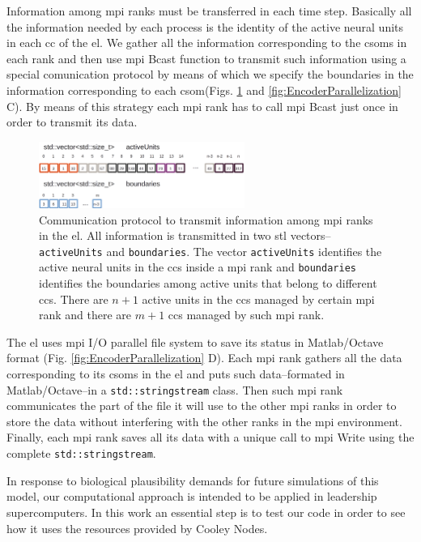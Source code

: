 \documentclass[11pt,a4paper]{article}
\begin{document}
Information among \gls{mpi} ranks must be transferred in each time step. Basically all the information needed by each process is the identity of the active neural units in each \gls{cc} of the \gls{el}. We gather all the information corresponding to the \glspl{csom} in each rank and then use \gls{mpi} Bcast function to transmit such information using a special comunication protocol by means of which we specify the boundaries in the information corresponding to each \gls{csom}(Figs. \ref{fig:BCast} and \ref{fig:EncoderParallelization} C). By means of this strategy each \gls{mpi} rank has to call \gls{mpi} Bcast just once in order to transmit its data.

\begin{figure}[h!]
    \centering
    \includegraphics[width=0.6\textwidth]{BCast.png}
    \caption{Communication protocol to transmit information among \gls{mpi} ranks in the \gls{el}. All information is transmitted in two \gls{stl} vectors--\texttt{activeUnits} and \texttt{boundaries}. The vector \texttt{activeUnits} identifies the active neural units in the \glspl{cc} inside a \gls{mpi} rank and \texttt{boundaries} identifies the boundaries among active units that belong to different \glspl{cc}. There are $n+1$ active units in the \glspl{cc} managed by certain \gls{mpi} rank and there are $m+1$ \glspl{cc} managed by such \gls{mpi} rank.}
    \label{fig:BCast}
\end{figure}

The \gls{el} uses \gls{mpi} I/O parallel file system to save its status in Matlab/Octave format (Fig. \ref{fig:EncoderParallelization} D). Each \gls{mpi} rank gathers all the data corresponding to its \glspl{csom} in the \gls{el} and puts such data--formated in Matlab/Octave--in a \texttt{std::stringstream} class. Then such \gls{mpi} rank communicates the part of the file it will use to the other \gls{mpi} ranks in order to store the data without interfering with the other ranks in the \gls{mpi} environment. Finally, each \gls{mpi} rank saves all its data with a unique call to \gls{mpi} Write using the complete \texttt{std::stringstream}.

In response to biological plausibility demands for future simulations of this model, our computational approach is intended to be applied in leadership supercomputers. In this work an essential step is to test our code in order to see how it uses the resources provided by Cooley Nodes.
\end{document}
